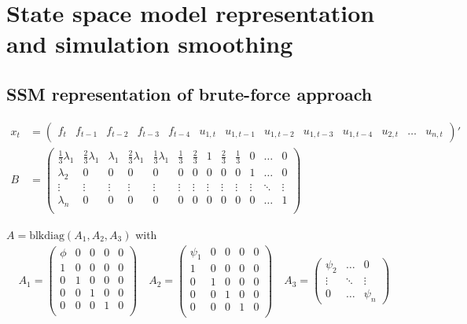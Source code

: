 \chapter{State space model representation and simulation smoothing}

\section{SSM representation of brute-force approach}

\setcounter{MaxMatrixCols}{15} %
\begin{align*}
x_t &= \begin{pmatrix}
f_t & f_{t-1} & f_{t-2} & f_{t-3} & f_{t-4} & u_{1,t} & u_{1,t-1} & u_{1,t-2} & u_{1,t-3} & u_{1,t-4} & u_{2,t} & \dots & u_{n,t}
\end{pmatrix}' \\
B &= \begin{pmatrix}
\frac{1}{3}\lambda_1 & \frac{2}{3}\lambda_1 & \lambda_1 & \frac{2}{3}\lambda_1 & \frac{1}{3} \lambda_1 & \frac{1}{3} & \frac{2}{3} & 1 & \frac{2}{3} & \frac{1}{3} & 0 & \dots & 0\\
\lambda_2 & 0 & 0 & 0 & 0 & 0 & 0 & 0 & 0 & 0 & 1 & \dots & 0\\
\vdots & \vdots & \vdots & \vdots & \vdots & \vdots & \vdots & \vdots & \vdots & \vdots & \vdots & \ddots &  \vdots \\
\lambda_n & 0 & 0 & 0 & 0 & 0 & 0 & 0 & 0 & 0 & 0 & \dots & 1\\
\end{pmatrix}
\end{align*}

$A = \mathrm{blkdiag}(A_1, A_2, A_3)$ with
\begin{align*}
A_1 = \begin{pmatrix}
\phi & 0 & 0 & 0 & 0 \\
1 & 0 & 0 & 0 & 0 \\
0 & 1 & 0 & 0 & 0 \\
0 & 0 & 1 & 0 & 0 \\
0 & 0 & 0 & 1 & 0 \\
\end{pmatrix}  \quad
A_2 = \begin{pmatrix}
\psi_1 & 0 & 0 & 0 & 0 \\
1 & 0 & 0 & 0 & 0 \\
0 & 1 & 0 & 0 & 0 \\
0 & 0 & 1 & 0 & 0 \\
0 & 0 & 0 & 1 & 0 \\
\end{pmatrix} \quad
A_3 = \begin{pmatrix}
\psi_2 & \dots  & 0 \\ 
\vdots & \ddots & \vdots \\
0      & \dots  & \psi_n
\end{pmatrix}
\end{align*}

